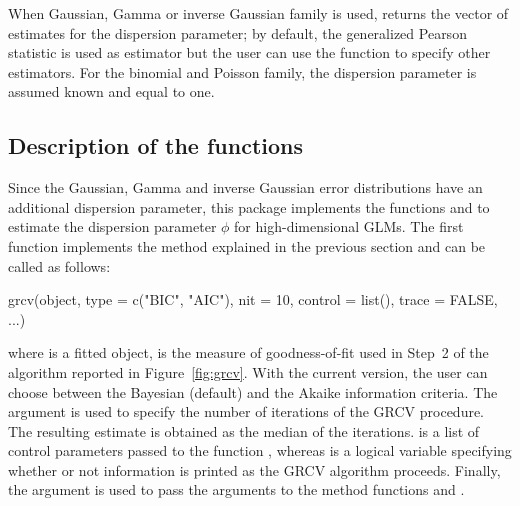 When {Gaussian}, {Gamma} or {inverse Gaussian} family is used,  returns the vector of estimates for the dispersion parameter; by default, the generalized Pearson statistic is used as estimator but the user can use the function  to specify other estimators. For the binomial and Poisson family, the dispersion parameter is assumed known and equal to one.

\subsection[Description of the functions grcv() and phihat()]{Description of the functions }
\label{subsec:phihatfun}

Since the {Gaussian}, {Gamma} and {inverse Gaussian} error distributions have an additional dispersion parameter, this package implements the functions  and  to estimate the dispersion parameter $\phi$ for high-dimensional GLMs. The first function implements the method explained in the previous section and can be called as follows:
%
\begin{example}
grcv(object, type = c("BIC", "AIC"), nit = 10, control = list(), trace = FALSE, ...)
\end{example}
%
where  is a fitted  object,  is the measure of goodness-of-fit used in Step~2 of the algorithm reported in Figure~\ref{fig:grcv}. With the current version, the user can choose between the Bayesian (default) and the Akaike information criteria. The argument  is used to specify the number of iterations of the GRCV procedure. The resulting estimate is obtained as the median of the  iterations.  is a list of control parameters passed to the function , whereas  is a logical variable specifying whether or not information is printed as the GRCV algorithm proceeds. Finally, the argument  is used to pass the arguments to the method functions  and  .

